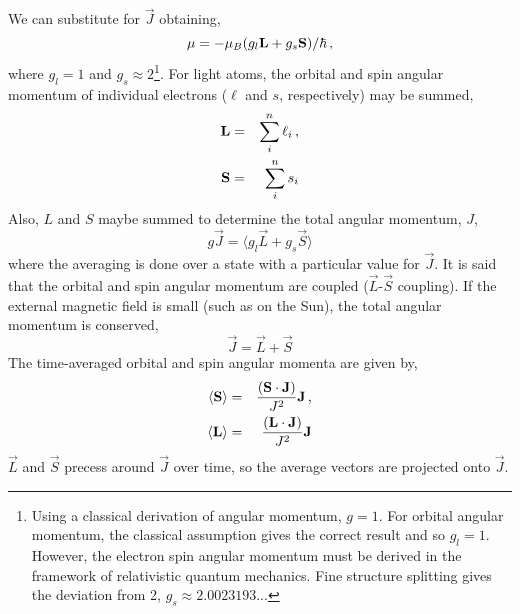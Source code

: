 We can substitute for $\vec{J}$ obtaining,
\begin{equation}\label{eqn:magmomls}
\mathbf{\mu}=-\mu_{B}(g_l\vec{L}+g_s\vec{S})/\hbar \mbox{\,,}
\end{equation}
where $g_l = 1$ and $g_s \approx 2$\footnote{Using a classical derivation of angular momentum, $g=1$. For orbital angular momentum, the classical assumption gives the correct result and so $g_l=1$. However, the electron spin angular momentum must be derived in the framework of relativistic quantum mechanics. Fine structure splitting gives the deviation from 2, $g_s \approx 2.0023193$... }.
For light atoms, the orbital and spin angular momentum of individual electrons ($\ell$ and $s$, respectively) may be summed,
\begin{eqnarray}
\vec{L} &=& \sum\limits_i^n \ell_i \mbox{\,,} \\
\vec{S} &=& \sum\limits_i^n s_i
\end{eqnarray}
Also, $L$ and $S$ maybe summed to determine the total angular momentum, $J$,
\begin{equation} 
g \vec{J} = \langle g_l \vec{L} + g_s \vec{S} \rangle
\end{equation}
where the averaging is done over a state with a particular value for $\vec{J}$. It is said that the orbital and spin angular momentum are coupled ($\vec{L}$-$\vec{S}$ coupling). If the external magnetic field is small (such as on the Sun), the total angular momentum is conserved,
\begin{equation}\label{eqn:jeqlpluss}
\vec{J}=\vec{L}+\vec{S}
\end{equation}
The time-averaged orbital and spin angular momenta are given by,
\begin{eqnarray}
\langle \vec{S} \rangle &=& \frac{(\vec{S} \cdot \vec{J})}{J^2}\vec{J} \mbox{\,,} \\
\langle \vec{L} \rangle &=& \frac{(\vec{L} \cdot \vec{J})}{J^2}\vec{J}
\end{eqnarray}
$\vec{L}$ and $\vec{S}$ precess around $\vec{J}$ over time, so the average vectors are projected onto $\vec{J}$.

